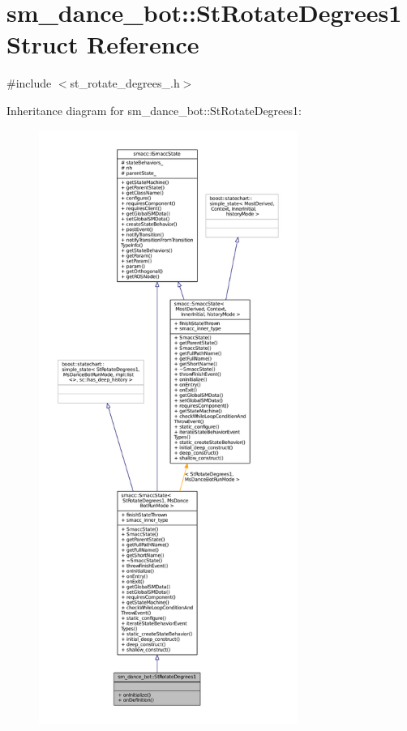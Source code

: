 \hypertarget{structsm__dance__bot_1_1StRotateDegrees1}{}\section{sm\+\_\+dance\+\_\+bot\+:\+:St\+Rotate\+Degrees1 Struct Reference}
\label{structsm__dance__bot_1_1StRotateDegrees1}


{\ttfamily \#include $<$st\+\_\+rotate\+\_\+degrees\+\_.\+h$>$}



Inheritance diagram for sm\+\_\+dance\+\_\+bot\+:\+:St\+Rotate\+Degrees1\+:
\nopagebreak
\begin{figure}[H]
\begin{center}
\leavevmode
\includegraphics[height=550pt]{structsm__dance__bot_1_1StRotateDegrees1__inherit__graph}
\end{center}
\end{figure}


